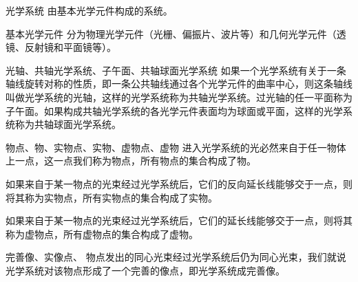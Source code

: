 

\begin{definition}{光学系统}
由基本光学元件构成的系统。
\end{definition}

\begin{definition}{基本光学元件}
分为物理光学元件（光栅、偏振片、波片等）和几何光学元件（透镜、反射镜和平面镜等）。
\end{definition}

\begin{definition}{光轴、共轴光学系统、子午面、共轴球面光学系统}
如果一个光学系统有关于一条轴线旋转对称的性质，即一条公共轴线通过各个光学元件的曲率中心，则这条轴线叫做光学系统的光轴，这样的光学系统称为共轴光学系统。过光轴的任一平面称为子午面。如果构成共轴光学系统的各光学元件表面均为球面或平面，这样的光学系统称为共轴球面光学系统。
\end{definition}

\begin{definition}{物点、物、实物点、实物、虚物点、虚物}
进入光学系统的光必然来自于任一物体上一点，这一点我们称为物点，所有物点的集合构成了物。

如果来自于某一物点的光束经过光学系统后，它们的反向延长线能够交于一点，则将其称为实物点，所有实物点的集合构成了实物。

如果来自于某一物点的光束经过光学系统后，它们的延长线能够交于一点，则将其称为虚物点，所有虚物点的集合构成了虚物。
\end{definition}

\begin{definition}{完善像、实像点、}
物点发出的同心光束经过光学系统后仍为同心光束，我们就说光学系统对该物点形成了一个完善的像点，即光学系统成完善像。
\end{definition}
